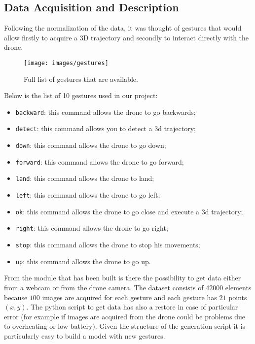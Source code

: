 \subsection{Data Acquisition and Description}
\label{sec:getdata}
Following the normalization of the data, it was thought of gestures that would allow firstly to acquire a 3D trajectory and secondly to interact directly with the drone. \\

\begin{figure}[H]
	\centering
	\texttt{[image: images/gestures]}
	\caption[Full list of gestures.]{Full list of gestures that are available.}
	\label{fig:gestures}
\end{figure}

\noindent Below is the list of 10 gestures used in our project:
\begin{itemize}
	\item \texttt{backward}: this command allows the drone to go backwards;
	\item \texttt{detect}: this command allows you to detect a \gls{3d} trajectory;
	\item \texttt{down}: this command allows the drone to go down;
	\item \texttt{forward}: this command allows the drone to go forward;
	\item \texttt{land}: this command allows the drone to land;
	\item \texttt{left}: this command allows the drone to go left;
	\item \texttt{ok}: this command allows the drone to go close and execute a \gls{3d} trajectory;
	\item \texttt{right}: this command allows the drone to go right;
	\item \texttt{stop}: this command allows the drone to stop his movements;
	\item \texttt{up}: this command allows the drone to go up.
\end{itemize}

\noindent From the module that has been built is there the possibility to get data either from a webcam or from the drone camera. The dataset consists of $42000$ elements because $100$ images are acquired for each gesture and each gesture has $21$ points $(x,y)$. The python script to get data has also a restore in case of particular error (for example if images are acquired from the drone could be problems due to overheating or low battery). Given the structure of the generation script it is particularly easy to build a model with new gestures.

